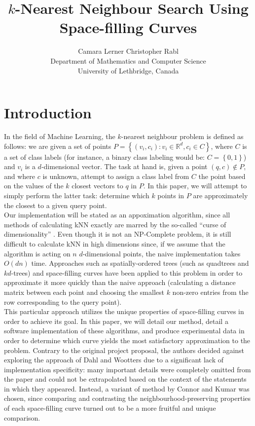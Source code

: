 \documentclass[10pt]{article}
\begin{document}
\title{$k$-Nearest Neighbour Search Using Space-filling Curves}
\author{Camara Lerner \hspace{2cm} Christopher Rabl \\
  Department of Mathematics and Computer Science \\
  University of Lethbridge, Canada}

\maketitle

\section{Introduction}

In the field of Machine Learning, the $k$-nearest neighbour problem is defined as follows: we are given a set of points $P = \left\{ {(v_i, c_i) : v_i \in \mathbb{R}^d, c_i \in C } \right\}$, where $C$ is a set of class labels (for instance, a binary class labeling would be: $C = \left\{ {0,1} \right\}$) and $v_i$ is a $d$-dimensional vector. The task at hand is, given a point $(q, c) \not \in P$, and where $c$ is unknown, attempt to assign a class label from $C$ the point based on the values of the $k$ closest vectors to $q$ in $P$. In this paper, we will attempt to simply perform the latter task: determine which $k$ points in $P$ are approximately the closest to a given query point. \\

Our implementation will be stated as an appoximation algorithm, since all methods of calculating kNN exactly are marred by the so-called ``curse of dimensionality'' \cite{Bellman:2003}. Even though it is not an NP-Complete problem, it is still difficult to calculate kNN in high dimensions since, if we assume that the algorithm is acting on $n$ $d$-dimensional points, the naive implementation takes $O(dn)$ time. Approaches such as spatially-ordered trees (such as quadtrees and $kd$-trees) and space-filling curves have been applied to this problem in order to approximate it more quickly than the naive approach (calculating a distance matrix between each point and choosing the smallest $k$ non-zero entries from the row corresponding to the query point). \\

This particular approach utilizes the unique properties of space-filling curves in order to achieve its goal. In this paper, we will detail our method, detail a software implementation of these algorithms, and produce experimental data in order to determine which curve yields the most satisfactory approximation to the problem. Contrary to the original project proposal, the authors decided against exploring the approach of Dahl and Wootters \cite{Dahl:2008} due to a significant lack of implementation specificity: many important details were completely omitted from the paper and could not be extrapolated based on the context of the statements in which they appeared. Instead, a variant of method by Connor and Kumar \cite{Connor:2010} was chosen, since comparing and contrasting the neighbourhood-preserving properties of each space-filling curve turned out to be a more fruitful and unique comparison.
\end{document}
